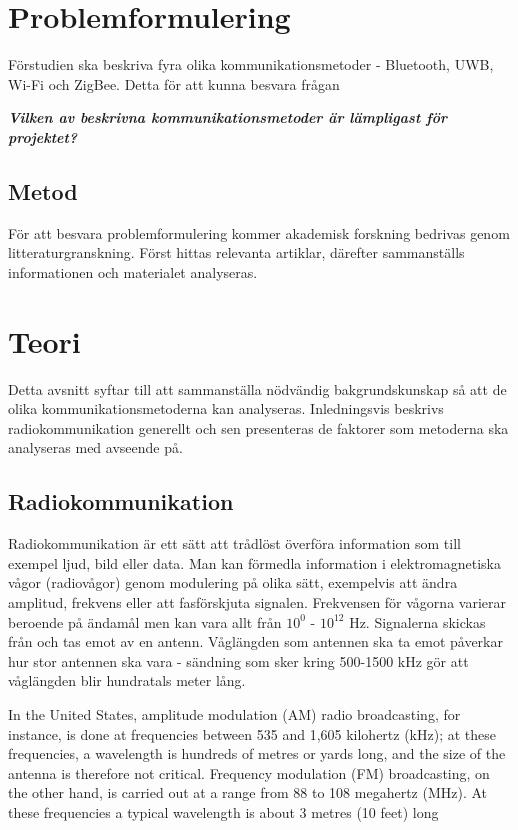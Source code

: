\documentclass[11pt]{article}
\begin{document}
\begin{flushleft}
\section{Problemformulering}
\label{sec:Problemformulering}
Förstudien ska beskriva fyra olika kommunikationsmetoder - Bluetooth, UWB, Wi-Fi och ZigBee. Detta för att kunna besvara frågan
\vspace{0.1 cm}

\begin{center}
\textit{\textbf{Vilken av beskrivna kommunikationsmetoder är lämpligast för projektet?}} 
\end{center}

\subsection{Metod}
\label{sec:Metod}
För att besvara problemformulering kommer akademisk forskning bedrivas genom litteraturgranskning. Först hittas relevanta artiklar, därefter sammanställs informationen och materialet analyseras.


\section{Teori}
\label{sec:Teori}
Detta avsnitt syftar till att sammanställa nödvändig bakgrundskunskap så att de olika kommunikationsmetoderna kan analyseras. Inledningsvis beskrivs radiokommunikation generellt och sen presenteras de faktorer som metoderna ska analyseras med avseende på.

\subsection{Radiokommunikation}
Radiokommunikation är ett sätt att trådlöst överföra information som till exempel ljud, bild eller data. Man kan förmedla information i elektromagnetiska vågor (radiovågor) genom modulering på olika sätt, exempelvis att ändra amplitud, frekvens eller att fasförskjuta signalen. Frekvensen för vågorna varierar beroende på ändamål men kan vara allt från $10^0$\cite{modulation_eb} - $10^{12}$\cite{microwave_eb} Hz. Signalerna skickas från och tas emot av en antenn. Våglängden som antennen ska ta emot påverkar hur stor antennen ska vara - sändning som sker kring 500-1500 kHz gör att våglängden blir hundratals meter lång.


In the United States, amplitude modulation (AM) radio broadcasting, for instance, is done at frequencies between 535 and 1,605 kilohertz (kHz); at these frequencies, a wavelength is hundreds of metres or yards long, and the size of the antenna is therefore not critical. Frequency modulation (FM) broadcasting, on the other hand, is carried out at a range from 88 to 108 megahertz (MHz). At these frequencies a typical wavelength is about 3 metres (10 feet) long


\end{flushleft}
\end{document}

